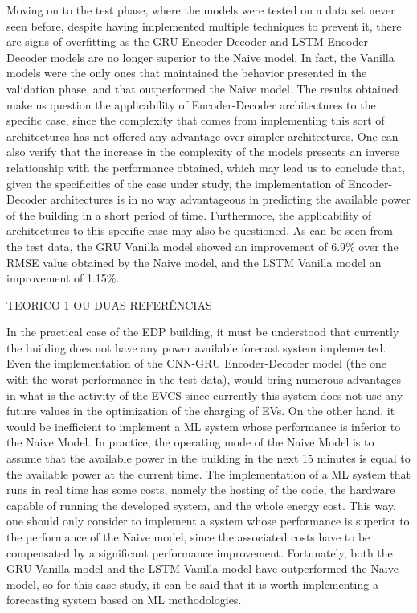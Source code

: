 Moving on to the test phase, where the models were tested on a data set never seen before, despite having implemented multiple techniques to prevent it, there are signs of overfitting as the \ac{GRU}-Encoder-Decoder  and \ac{LSTM}-Encoder-Decoder models are no longer superior to the Naive model. In fact, the Vanilla models were the only ones that maintained the behavior presented in the validation phase, and that outperformed the Naive model. The results obtained make us question the applicability of Encoder-Decoder architectures to the specific case, since the complexity that comes from implementing this sort of architectures has not offered any advantage over simpler architectures. One can also verify that the increase in the complexity of the models presents an inverse relationship with the performance obtained, which may lead us to conclude that, given the specificities of the case under study, the implementation of Encoder-Decoder architectures is in no way advantageous in predicting the available power of the building in a short period of time. Furthermore, the applicability of architectures to this specific case may also be questioned. As can be seen from the test data, the \ac{GRU} Vanilla model showed an improvement of 6.9\% over the \ac{RMSE} value obtained by the Naive model, and the \ac{LSTM} Vanilla model an improvement of 1.15\%. 


TEORICO 1 OU DUAS REFERÊNCIAS
 
In the practical case of the EDP building, it must be understood that currently the building does not have any power available forecast system implemented. Even the implementation of the \ac{CNN}-\ac{GRU} Encoder-Decoder model (the one with the worst performance in the test data), would bring numerous advantages in what is the activity of the \ac{EVCS} since currently this system does not use any future values in the optimization of the charging of \ac{EV}s. On the other hand, it would be inefficient to implement a \ac{ML}  system whose performance is inferior to the Naive Model. In practice, the operating mode of the Naive Model is to assume that the available power in the building in the next 15 minutes is equal to the available power at the current time. The implementation of a \ac{ML} system that runs in real time has some costs, namely the hosting of the code, the hardware capable of running the developed system, and the whole energy cost. This way, one should only consider to implement a system whose performance is superior to the performance of the Naive model, since the associated costs have to be compensated by a significant performance improvement. Fortunately, both the \ac{GRU} Vanilla model and the \ac{LSTM} Vanilla model have outperformed the Naive model, so for this case study, it can be said that it is worth implementing a forecasting system based on \ac{ML} methodologies.


